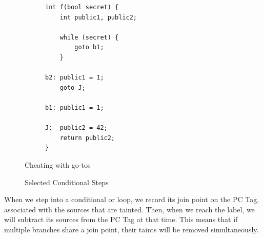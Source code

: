\documentclass[acmsmall,review,anonymous]{acmart}\settopmatter{printfolios=true,printccs=false,printacmref=false}
\begin{document}
\begin{figure}
  \begin{subfigure}{0.3\textwidth}
\begin{verbatim}
int f(bool secret) {
    int public1, public2;

    while (secret) {
        goto b1;
    }

b2: public1 = 1;
    goto J;

b1: public1 = 1;

J:  public2 = 42;
    return public2;
}
\end{verbatim}
  \end{subfigure}
  \begin{subfigure}{0.5\textwidth}
  \end{subfigure}
  
  \caption{Cheating with go-tos}
  \label{fig:forbreak}
\end{figure}

\begin{figure}
  \ifstepb
  
  \whiletruestep
  \whilefalsestep
  \whileskipcontinuestep
  \whilebreakstep


  \caption{Selected Conditional Steps}
  \label{fig:conditionals}
\end{figure}


When we step into a conditional or loop, we record its join point on the PC Tag, associated with the sources
that are tainted. Then, when we reach the label, we will subtract its sources from the PC Tag at that time.
This means that if multiple branches share a join point, their taints will be removed simultaneously.
\end{document}
